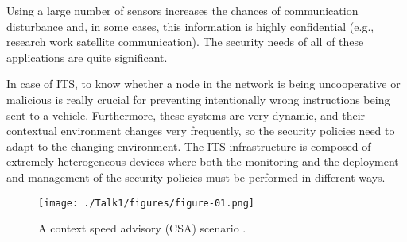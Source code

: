 \documentclass[12pt,a4paper,twoside]{report}
\begin{document}
Using a large number of sensors increases the chances of communication disturbance and, in some cases, this information is highly confidential (e.g., research work satellite communication). The security needs of all of these applications are quite significant. \par
In case of ITS, to know whether a node in the network is being uncooperative or malicious is really crucial for preventing intentionally wrong instructions being sent to a vehicle. Furthermore, these systems are very dynamic, and their contextual environment changes very frequently, so the security policies need to adapt to the changing environment. The ITS infrastructure is composed of extremely heterogeneous devices where both the monitoring and the deployment and management of the security policies must be performed in different ways.
\begin{figure}[ht]
	\begin{center}
  \texttt{[image: ./Talk1/figures/figure-01.png]}
  \end{center}
  \caption{A context speed advisory (CSA) scenario \cite{Pinto;etal:2013}.}
  \label{fig:01}
\end{figure}
\end{document}
